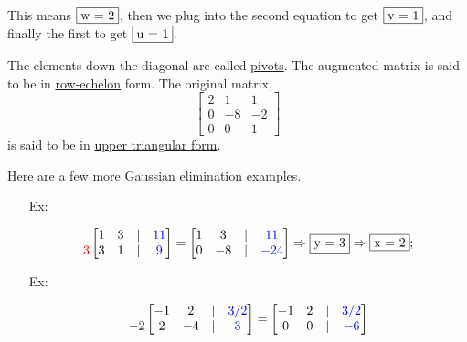 \documentclass[reqno]{amsart}
\theoremstyle{definition}
\begin{document}
%
This means $\fbox{w = 2}$, then we plug into the second equation to get $\fbox{v = 1}$,
and finally the first to get $\fbox{u = 1}$.

The elements down the diagonal are called \underline{pivots}.  The augmented matrix is said to be in 
\underline{row-echelon} form.  The original matrix,
%
\begin{equation*}
\begin{bmatrix}
2 & 1 & 1\\
0 & -8 & -2\\
0 & 0 & 1
\end{bmatrix}
\end{equation*}
%
is said to be in \underline{upper triangular form}.


Here are a few more Gaussian elimination examples.
%
\begin{enumerate}

\item[Ex:   ]  

\begin{equation*}
\begin{matrix}
\\
{\color{red}3}
\end{matrix}\begin{bmatrix}
1 & 3 & | & {\color{blue}11}\\
3 & 1 & | & {\color{blue}9}
\end{bmatrix} = \begin{bmatrix}
1 & 3 & | & {\color{blue}11}\\
0 & -8 & | & {\color{blue}-24}
\end{bmatrix}
\Rightarrow \fbox{y = 3} \Rightarrow \fbox{x = 2};
\end{equation*}

\item[Ex:   ]  

\begin{equation*}
\begin{matrix}
\\
-2
\end{matrix}
\begin{bmatrix}
-1 & 2 & | & {\color{blue}3/2}\\
2 & -4 & | & {\color{blue}3}
\end{bmatrix} = \begin{bmatrix}
-1 & 2 & | & {\color{blue}3/2}\\
0 & 0 & | & {\color{blue}-6}
\end{bmatrix}
\end{equation*}


\end{enumerate}
\end{document}

